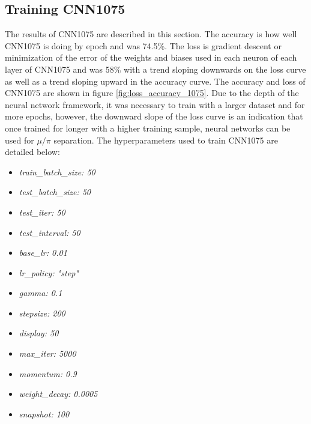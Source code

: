 \subsection{Training CNN1075}
The results of CNN1075 are described in this section. The accuracy is how well CNN1075 is doing by epoch and was 74.5\%. The loss is gradient descent or minimization of the error of the weights and biases used in each neuron of each layer of CNN1075 and was 58\% with a trend sloping downwards on the loss curve as well as a trend sloping upward in the accuracy curve. The accuracy and loss of CNN1075 are shown in figure \ref{fig:loss_accuracy_1075}. Due to the depth of the neural network framework, it was necessary to train with a larger dataset and for more epochs, however, the downward slope of the loss curve is an indication that once trained for longer with a higher training sample, neural networks can be used for $\mu/\pi$ separation. The hyperparameters used to train CNN1075 are detailed below: 

\begin{multicols}{3}
\begin{itemize}
 \item \textit{train{\_}batch{\_}size: 50}
 \item \textit{test{\_}batch{\_}size: 50}
 \item \textit{test{\_}iter: 50}
 \item \textit{test{\_}interval: 50}
 \item \textit{base{\_}lr: 0.01}
 \item \textit{lr{\_}policy: "step"}
 \item \textit{gamma: 0.1}
 \item \textit{stepsize: 200}
 \item \textit{display: 50}
 \item \textit{max{\_}iter: 5000}
 \item \textit{momentum: 0.9}
 \item \textit{weight{\_}decay: 0.0005}
 \item \textit{snapshot: 100}
\end{itemize}
\end{multicols}

